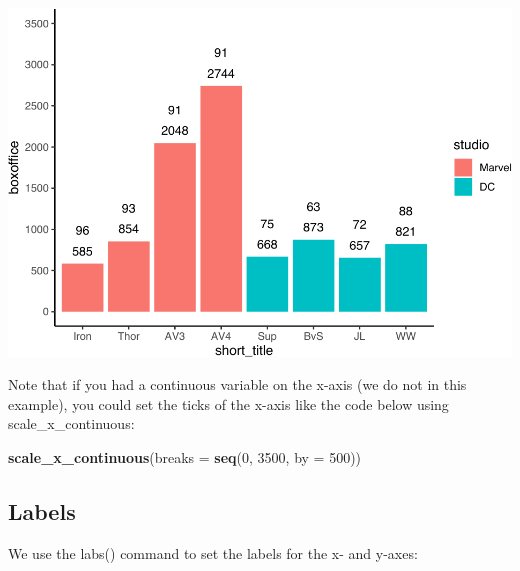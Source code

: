 \documentclass[
]{krantz}
\makeatletter
\newenvironment{Shaded}{\begin{snugshade}}{\end{snugshade}}
\newcommand{\DataTypeTok}[1]{\textcolor[rgb]{0.27,0.27,0.27}{#1}}
\newcommand{\DecValTok}[1]{\textcolor[rgb]{0.06,0.06,0.06}{#1}}
\newcommand{\KeywordTok}[1]{\textcolor[rgb]{0.27,0.27,0.27}{\textbf{#1}}}
\newcommand{\NormalTok}[1]{#1}
\newenvironment{kframe}{%
\medskip{}
\setlength{\fboxsep}{.8em}
 \def\at@end@of@kframe{}%
 \ifinner\ifhmode%
  \def\at@end@of@kframe{\end{minipage}}%
  \begin{minipage}{\columnwidth}%
 \fi\fi%
 \def\FrameCommand##1{\hskip\@totalleftmargin \hskip-\fboxsep
 \colorbox{shadecolor}{##1}\hskip-\fboxsep
     \hskip-\linewidth \hskip-\@totalleftmargin \hskip\columnwidth}%
 \MakeFramed {\advance\hsize-\width
   \@totalleftmargin\z@ \linewidth\hsize
   \@setminipage}}%
 {\par\unskip\endMakeFramed%
 \at@end@of@kframe}
\renewenvironment{Shaded}{\begin{kframe}}{\end{kframe}}
\makeatother
\begin{document}
\includegraphics{bookdown_files/figure-latex/unnamed-chunk-249-1.pdf}

Note that if you had a continuous variable on the x-axis (we do not in this example), you could set the ticks of the x-axis like the code below using scale\_x\_continuous:

\begin{Shaded}
\begin{Highlighting}[]
\KeywordTok{scale_x_continuous}\NormalTok{(}\DataTypeTok{breaks =} \KeywordTok{seq}\NormalTok{(}\DecValTok{0}\NormalTok{, }\DecValTok{3500}\NormalTok{, }\DataTypeTok{by =} \DecValTok{500}\NormalTok{))}
\end{Highlighting}
\end{Shaded}

\hypertarget{labels}{%
\subsection{Labels}\label{labels}}

We use the labs() command to set the labels for the x- and y-axes:
\end{document}
